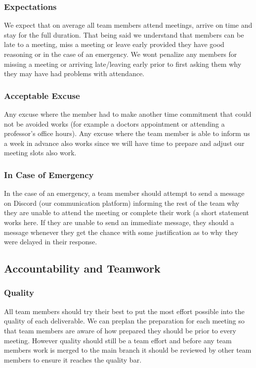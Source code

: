 \documentclass{article}
\begin{document}
\subsubsection*{Expectations}


We expect that on average all team members attend meetings, arrive on time and stay for the full duration. That being said we understand that members can be late to a meeting, miss a meeting or leave early provided they have good reasoning or in the case of an emergency. We wont penalize any members for missing a meeting or arriving late/leaving early prior to first asking them why they may have had problems with attendance. 

\subsubsection*{Acceptable Excuse}

Any excuse where the member had to make another time commitment that could not be avoided works (for example a doctors appointment or attending a professor's office hours). Any excuse where the team member is able to inform us a week in advance also works since we will have time to prepare and adjust our meeting slots also work. 

\subsubsection*{In Case of Emergency}
In the case of an emergency, a team member should attempt to send a message on Discord (our communication platform) informing the rest of the team why they are unable to attend the meeting or complete their work (a short statement works here. If they are unable to send an immediate message, they should a message whenever they get the chance with some justification as to why they were delayed in their response. 

\subsection*{Accountability and Teamwork}

\subsubsection*{Quality} 


All team members should try their best to put the most effort possible into the quality of each deliverable. We can preplan the preparation for each meeting so that team members are aware of how prepared they should be prior to every meeting. However quality should still be a team effort and before any team members work is merged to the main branch it should be reviewed by other team members to ensure it reaches the quality bar. 
\end{document}
